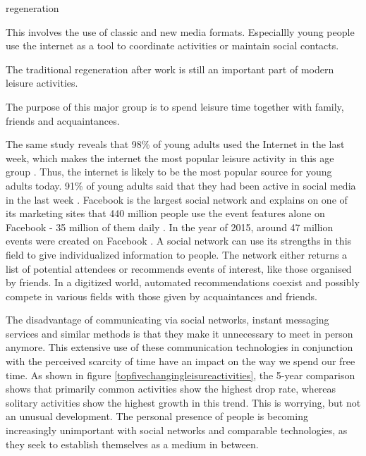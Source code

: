 \documentclass[12pt,numbers=noenddot,parskip,bibliography=totocnumbered,listof=totocnumbered,draft=true]{scrreprt}
\begin{document}
\begin{labeling}{regeneration}
\item[media use] This involves the use of classic and new media formats. Especiallly young people use the internet as a tool to coordinate activities or maintain social contacts.
\item[regeneration] The traditional regeneration after work is still an important part of modern leisure activities.
\item[socialize] The purpose of this major group is to spend leisure time together with family, friends and acquaintances.
\end{labeling}

The same study reveals that 98\% of young adults used the Internet in the last week, which makes the internet the most popular leisure activity in this age group \cite{freizeitmonitor2016}. Thus, the internet is likely to be the most popular source for young adults today. 91\% of young adults said that they had been active in social media in the last week \cite{freizeitmonitor2016}. Facebook is the largest social network and explains on one of its marketing sites that 440 million people use the event features alone on Facebook - 35 million of them daily \citep{facebook2017}. In the year of 2015, around 47 million events were created on Facebook \citep{facebook2017}. A social network can use its strengths in this field to give individualized information to people. The network either returns a list of potential attendees or recommends events of interest, like those organised by friends. In a digitized world, automated recommendations coexist and possibly compete in various fields with those given by acquaintances and friends.

The disadvantage of communicating via social networks, instant messaging services and similar methods is that they make it unnecessary to meet in person anymore. This extensive use of these communication technologies in conjunction with the perceived scarcity of time have an impact on the way we spend our free time. As shown in figure \ref{topfivechangingleisureactivities}, the 5-year comparison shows that primarily common activities show the highest drop rate, whereas solitary activities show the highest growth in this trend. This is worrying, but not an unusual development. The personal presence of people is becoming increasingly unimportant with social networks and comparable technologies, as they seek to establish themselves as a medium in between.
\end{document}
